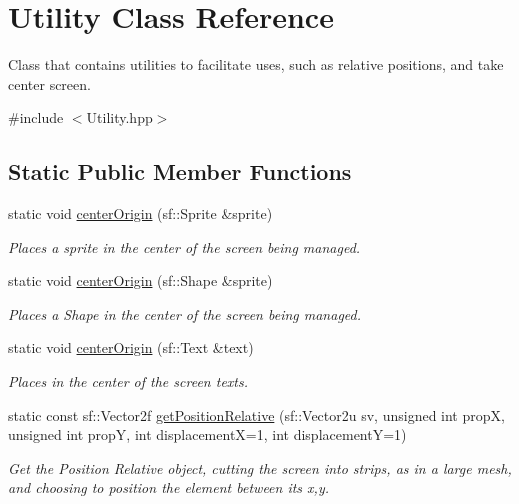 \hypertarget{classUtility}{}\section{Utility Class Reference}
\label{classUtility}


Class that contains utilities to facilitate uses, such as relative positions, and take center screen.  




{\ttfamily \#include $<$Utility.\+hpp$>$}

\subsection*{Static Public Member Functions}
\begin{DoxyCompactItemize}
\item 
static void \hyperlink{classUtility_a740b125c33224b1845cc8cd34481344f}{center\+Origin} (sf\+::\+Sprite \&sprite)
\begin{DoxyCompactList}\small\item\em Places a sprite in the center of the screen being managed. \end{DoxyCompactList}\item 
static void \hyperlink{classUtility_afb1f918173dab3a113304952b7d5fb86}{center\+Origin} (sf\+::\+Shape \&sprite)
\begin{DoxyCompactList}\small\item\em Places a Shape in the center of the screen being managed. \end{DoxyCompactList}\item 
static void \hyperlink{classUtility_ac60c8088a90a2839e35d79d8ac8c8a50}{center\+Origin} (sf\+::\+Text \&text)
\begin{DoxyCompactList}\small\item\em Places in the center of the screen texts. \end{DoxyCompactList}\item 
static const sf\+::\+Vector2f \hyperlink{classUtility_adc3cdc839cb23f7fcbaee921bdeecbb2}{get\+Position\+Relative} (sf\+::\+Vector2u sv, unsigned int propX, unsigned int propY, int displacementX=1, int displacementY=1)
\begin{DoxyCompactList}\small\item\em Get the Position Relative object, cutting the screen into strips, as in a large mesh, and choosing to position the element between its x,y. \end{DoxyCompactList}\item 

\end{DoxyCompactItemize}
